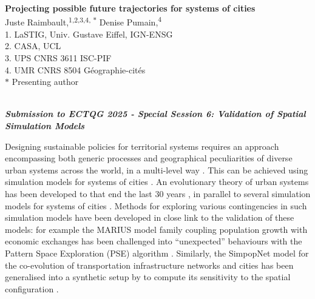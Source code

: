\documentclass[11pt]{article}
\renewcommand{\title}[1]{{\noindent\large\bfseries#1\medskip\\}}
\renewcommand{\author}[2]{{\noindent #1 \medskip\\ \small #2 \medskip\\}}
\begin{document}
\title{Projecting possible future trajectories for systems of cities}
\author{
Juste Raimbault,\textsuperscript{1,2,3,4, $\ast$}
Denise Pumain,\textsuperscript{4}
}
{
1. LaSTIG, Univ. Gustave Eiffel, IGN-ENSG\\
2. CASA, UCL\\
3. UPS CNRS 3611 ISC-PIF\\
4. UMR CNRS 8504 G{\'e}ographie-cit{\'e}s\\
$\ast$ Presenting author\\
}








\vspace{-1cm}
\noindent
\textit{\textbf{Submission to ECTQG 2025 - Special Session 6: Validation of Spatial Simulation Models}}

\vspace{1cm}

Designing sustainable policies for territorial systems requires an approach encompassing both generic processes and geographical peculiarities of diverse urban systems across the world, in a multi-level way \cite{rozenblat2018conclusion}. This can be achieved using simulation models for systems of cities \cite{raimbault2021spatial}. An evolutionary theory of urban systems has been developed to that end the last 30 years \cite{pumain1997pour, pumain2017urban}, in parallel to several simulation models for systems of cities \cite{pumain2011multi}. Methods for exploring various contingencies in such simulation models have been developed in close link to the validation of these models: for example the MARIUS model family coupling population growth with economic exchanges has been challenged into ``unexpected'' behaviours with the Pattern Space Exploration (PSE) algorithm \cite{cherel2015beyond}. Similarly, the SimpopNet model for the co-evolution of transportation infrastructure networks and cities has been generalised into a synthetic setup by \cite{raimbault2020unveiling} to compute its sensitivity to the spatial configuration \cite{raimbault2019space}.
\end{document}

